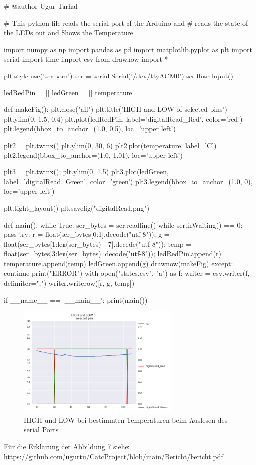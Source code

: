 \documentclass[12pt]{article}
\begin{document}
\begin{python}
# @author Ugur Turhal

# This python file reads the serial port of the Arduino and
# reads the state of the LEDs out and Shows the Temperature

import numpy as np
import pandas as pd
import matplotlib.pyplot as plt
import serial
import time
import csv
from drawnow import *

plt.style.use('seaborn')
ser = serial.Serial('/dev/ttyACM0')
ser.flushInput()

ledRedPin = []
ledGreen = []
temperature = []


def makeFig():
    plt.close("all")
    plt.title('HIGH and LOW of \n selected pins')
    plt.ylim(0, 1.5, 0.4)
    plt.plot(ledRedPin, label='digitalRead_Red', color='red')
    plt.legend(bbox_to_anchor=(1.0, 0.5), loc='upper left')

    plt2 = plt.twinx()
    plt.ylim(0, 30, 6)
    plt2.plot(temperature, label='C')
    plt2.legend(bbox_to_anchor=(1.0, 1.01), loc='upper left')

    plt3 = plt.twinx();
    plt.ylim(0, 1.5)
    plt3.plot(ledGreen, label='digitalRead_Green', color='green')
    plt3.legend(bbox_to_anchor=(1.0, 0), loc='upper left')

    plt.tight_layout()
    plt.savefig("digitalRead.png")


def main():
    while True:
        ser_bytes = ser.readline()
        while ser.inWaiting() == 0:
            pass
        try:
            r = float(ser_bytes[0:1].decode("utf-8"));
            g = float(ser_bytes[1:len(ser_bytes) - 7].decode("utf-8"));
            temp = float(ser_bytes[3:len(ser_bytes)].decode("utf-8"));
            ledRedPin.append(r)
            temperature.append(temp)
            ledGreen.append(g)
            drawnow(makeFig)
        except:
            continue
            print("ERROR")
        with open("states.csv", "a") as f:
            writer = csv.writer(f, delimiter=",")
            writer.writerow([r, g, temp])


if __name__ == '__main__':
    print(main())

\end{python}
\begin{figure}[H]
\begin{center}
\includegraphics[width=0.7\textwidth]{pics/digitalRead.png}
\caption{HIGH und LOW bei bestimmten Temperaturen beim Auslesen des serial Ports}
\end{center}
\end{figure}
Für die Erklärung der Abbildung 7 siehe: \url{https://github.com/ugurtu/CatcProject/blob/main/Bericht/bericht.pdf}
\end{document}
